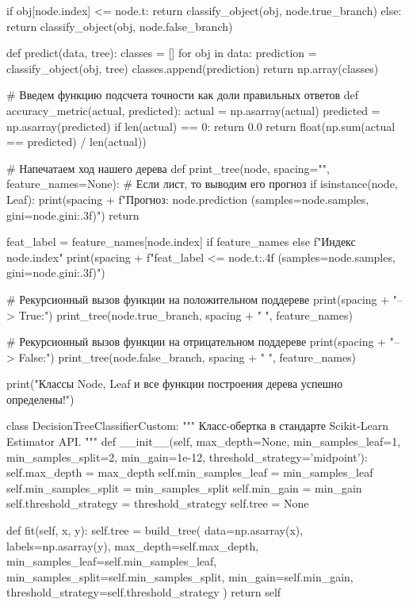 \documentclass[14pt,a4paper]{extarticle}
\begin{document}
\begin{CodeListing}
    if obj[node.index] <= node.t:
        return classify_object(obj, node.true_branch)
    else:
        return classify_object(obj, node.false_branch)


def predict(data, tree):
    classes = []
    for obj in data:
        prediction = classify_object(obj, tree)
        classes.append(prediction)
    return np.array(classes)


# Введем функцию подсчета точности как доли правильных ответов
def accuracy_metric(actual, predicted):
    actual = np.asarray(actual)
    predicted = np.asarray(predicted)
    if len(actual) == 0:
        return 0.0
    return float(np.sum(actual == predicted) / len(actual))


# Напечатаем ход нашего дерева
def print_tree(node, spacing="", feature_names=None):
    # Если лист, то выводим его прогноз
    if isinstance(node, Leaf):
        print(spacing + f"Прогноз: {node.prediction} (samples={node.samples}, gini={node.gini:.3f})")
        return

    feat_label = feature_names[node.index] if feature_names else f"Индекс {node.index}"
    print(spacing + f"{feat_label} <= {node.t:.4f} (samples={node.samples}, gini={node.gini:.3f})")

    # Рекурсионный вызов функции на положительном поддереве
    print(spacing + "--> True:")
    print_tree(node.true_branch, spacing + "  ", feature_names)

    # Рекурсионный вызов функции на отрицательном поддереве
    print(spacing + "--> False:")
    print_tree(node.false_branch, spacing + "  ", feature_names)

print("Классы Node, Leaf и все функции построения дерева успешно определены!")

class DecisionTreeClassifierCustom:
    """
    Класс-обертка в стандарте Scikit-Learn Estimator API.
    """
    def __init__(self, max_depth=None, min_samples_leaf=1, min_samples_split=2,
                 min_gain=1e-12, threshold_strategy='midpoint'):
        self.max_depth = max_depth
        self.min_samples_leaf = min_samples_leaf
        self.min_samples_split = min_samples_split
        self.min_gain = min_gain
        self.threshold_strategy = threshold_strategy
        self.tree = None

    def fit(self, x, y):
        self.tree = build_tree(
            data=np.asarray(x),
            labels=np.asarray(y),
            max_depth=self.max_depth,
            min_samples_leaf=self.min_samples_leaf,
            min_samples_split=self.min_samples_split,
            min_gain=self.min_gain,
            threshold_strategy=self.threshold_strategy
        )
        return self


\end{CodeListing}
\end{document}
